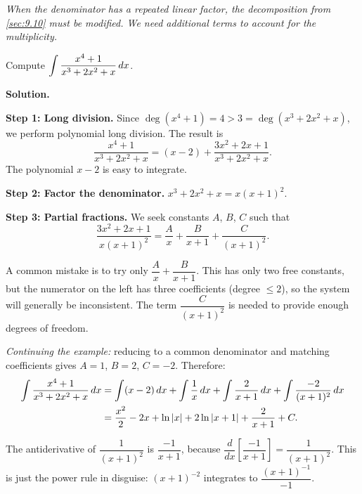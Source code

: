 \textit{When the denominator has a repeated linear factor, the decomposition from \cref{sec:9.10} must be modified.  We need additional terms to account for the multiplicity.}

\begin{example}
\label{ex:9-18}
Compute $\displaystyle\int \frac{x^{4}+1}{x^{3}+2x^{2}+x}\,dx$.

\textbf{Solution.}

\textbf{Step 1: Long division.}  Since $\deg(x^{4}+1) = 4 > 3 = \deg(x^{3}+2x^{2}+x)$, we perform polynomial long division.  The result is
\[
  \frac{x^{4}+1}{x^{3}+2x^{2}+x} = (x - 2) + \frac{3x^{2}+2x+1}{x^{3}+2x^{2}+x}.
\]
The polynomial $x - 2$ is easy to integrate.

\textbf{Step 2: Factor the denominator.}  $x^{3}+2x^{2}+x = x(x+1)^{2}$.

\textbf{Step 3: Partial fractions.}  We seek constants $A$, $B$, $C$ such that
\[
  \frac{3x^{2}+2x+1}{x(x+1)^{2}} = \frac{A}{x} + \frac{B}{x+1} + \frac{C}{(x+1)^{2}}.
\]
\end{example}

\begin{remark}[Warning]
A common mistake is to try only $\dfrac{A}{x} + \dfrac{B}{x+1}$.  This has only two free constants, but the numerator on the left has three coefficients (degree $\leq 2$), so the system will generally be inconsistent.  The term $\dfrac{C}{(x+1)^{2}}$ is needed to provide enough degrees of freedom.
\end{remark}

\textit{Continuing the example:} reducing to a common denominator and matching coefficients gives $A = 1$, $B = 2$, $C = -2$.  Therefore:
\begin{align*}
  \int \frac{x^{4}+1}{x^{3}+2x^{2}+x}\,dx &= \int (x-2)\,dx + \int \frac{1}{x}\,dx + \int \frac{2}{x+1}\,dx + \int \frac{-2}{(x+1)^{2}}\,dx \\
  &= \frac{x^{2}}{2} - 2x + \ln\left\lvert x \right\rvert + 2\ln\left\lvert x+1 \right\rvert + \frac{2}{x+1} + C.
\end{align*}

\begin{remark}
The antiderivative of $\dfrac{1}{(x+1)^{2}}$ is $\dfrac{-1}{x+1}$, because $\dfrac{d}{dx}\!\left[\dfrac{-1}{x+1}\right] = \dfrac{1}{(x+1)^{2}}$.  This is just the power rule in disguise: $(x+1)^{-2}$ integrates to $\dfrac{(x+1)^{-1}}{-1}$.
\end{remark}


